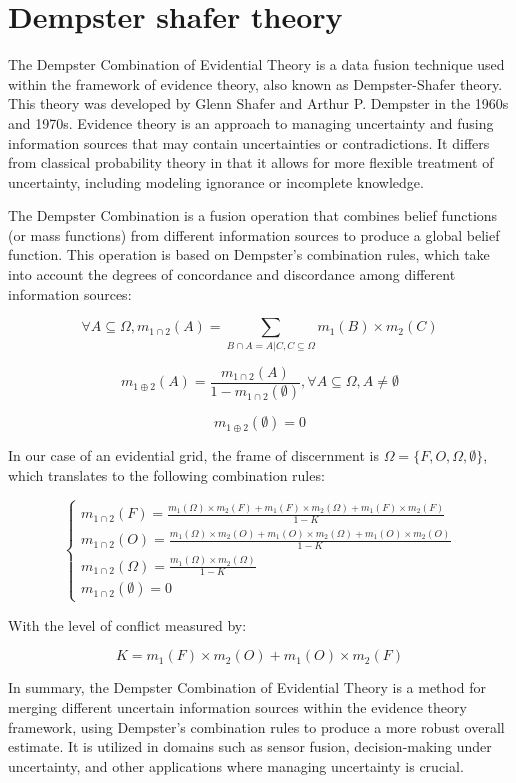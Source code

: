 \section{Dempster shafer theory}

The Dempster Combination of Evidential Theory is a data fusion technique used within the framework of evidence theory, also known as Dempster-Shafer theory.
This theory was developed by Glenn Shafer and Arthur P. Dempster in the 1960s and 1970s.
Evidence theory is an approach to managing uncertainty and fusing information sources that may contain uncertainties or contradictions. It differs from classical probability theory in that it allows for more flexible treatment of uncertainty, including modeling ignorance or incomplete knowledge.

The Dempster Combination is a fusion operation that combines belief functions (or mass functions) from different information sources to produce a global belief function.
This operation is based on Dempster's combination rules, which take into account the degrees of concordance and discordance among different information sources:

$$
    \forall A \subseteq \Omega, m_{1\cap2}(A) = \sum_{B\cap A = A | C, C \subseteq \Omega} m_{1}(B) \times m_{2}(C)
$$

$$
    m_{1\oplus2}(A) = \frac{m_{1\cap2}(A)}{1-m_{1\cap2}(\emptyset)}, \forall A\subseteq \Omega, A \neq \emptyset
$$

$$
    m_{1 \oplus 2}(\emptyset) = 0
$$

In our case of an evidential grid, the frame of discernment is $\Omega = \{F, O, \Omega, \emptyset\}$, which translates to the following combination rules:

$$
    \begin{cases}
        m_{1\cap2}(F) = \frac{m_{1}(\Omega) \times m_{2}(F) + m_{1}(F) \times m_{2}(\Omega) + m_{1}(F) \times m_{2}(F)}{1 - K} \\
        m_{1\cap2}(O) = \frac{m_{1}(\Omega) \times m_{2}(O) + m_{1}(O) \times m_{2}(\Omega) + m_{1}(O) \times m_{2}(O)}{1 - K} \\
        m_{1\cap2}(\Omega) = \frac{m_{1}(\Omega) \times m_{2}(\Omega)}{1 - K}                                                  \\
        m_{1\cap2}(\emptyset) = 0
    \end{cases}
$$

With the level of conflict measured by:

$$
    K = m_{1}(F) \times m_{2}(O) + m_{1}(O) \times m_{2}(F)
$$

In summary, the Dempster Combination of Evidential Theory is a method for merging different uncertain information sources within the evidence theory framework, using Dempster's combination rules to produce a more robust overall estimate.
It is utilized in domains such as sensor fusion, decision-making under uncertainty, and other applications where managing uncertainty is crucial.
